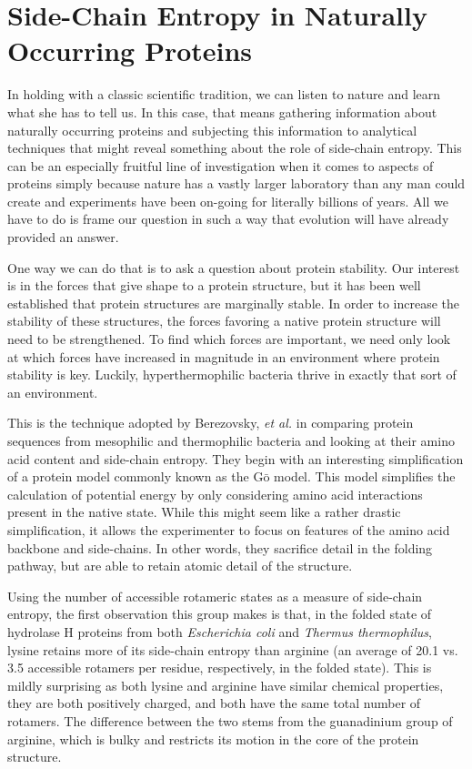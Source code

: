 \section*{Side-Chain Entropy in Naturally Occurring Proteins}
\label{sec:side_chain_entropy_of_x_ray_structures}
In holding with a classic scientific tradition, we can listen to nature and learn what she has to tell us. In this case, that means gathering information about naturally occurring proteins and subjecting this information to analytical techniques that might reveal something about the role of side-chain entropy. This can be an especially fruitful line of investigation when it comes to aspects of proteins simply because nature has a vastly larger laboratory than any man could create and experiments have been on-going for literally billions of years. All we have to do is frame our question in such a way that evolution will have already provided an answer.

One way we can do that is to ask a question about protein stability. Our interest is in the forces that give shape to a protein structure, but it has been well established that protein structures are marginally stable. In order to increase the stability of these structures, the forces favoring a native protein structure will need to be strengthened. To find which forces are important, we need only look at which forces have increased in magnitude in an environment where protein stability is key. Luckily, hyperthermophilic bacteria thrive in exactly that sort of an environment.

This is the technique adopted by Berezovsky, \emph{et al.}\cite{Berezovsky:2005p40} in comparing protein sequences from mesophilic and thermophilic bacteria and looking at their amino acid content and side-chain entropy. They begin with an interesting simplification of a protein model commonly known as the $\mathrm{G\bar{o}}$ model. This model simplifies the calculation of potential energy by only considering amino acid interactions present in the native state. While this might seem like a rather drastic simplification, it allows the experimenter to focus on features of the amino acid backbone and side-chains. In other words, they sacrifice detail in the folding pathway, but are able to retain atomic detail of the structure.

Using the number of accessible rotameric states as a measure of side-chain entropy, the first observation this group makes is that, in the folded state of hydrolase H proteins from both \emph{Escherichia coli} and \emph{Thermus thermophilus}, lysine retains more of its side-chain entropy than arginine (an average of 20.1 vs. 3.5 accessible rotamers per residue, respectively, in the folded state). This is mildly surprising as both lysine and arginine have similar chemical properties, they are both positively charged, and both have the same total number of rotamers. The difference between the two stems from the guanadinium group of arginine, which is bulky and restricts its motion in the core of the protein structure.

